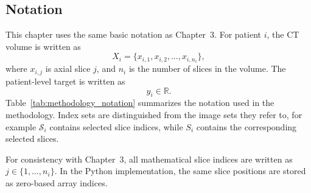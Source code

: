 \subsection{Notation}
\label{sec:notation}

This chapter uses the same basic notation as Chapter~3. For patient \(i\), the CT volume is written as
\[
X_i = \{x_{i,1}, x_{i,2}, \dots, x_{i,n_i}\},
\]
where \(x_{i,j}\) is axial slice \(j\), and \(n_i\) is the number of slices in the volume. The patient-level target is written as
\[
y_i \in \mathbb{R}.
\]
Table~\ref{tab:methodology_notation} summarizes the notation used in the methodology. Index sets are distinguished from the image sets they refer to, for example \(\mathcal{S}_i\) contains selected slice indices, while \(S_i\) contains the corresponding selected slices.

For consistency with Chapter~3, all mathematical slice indices are written as \(j \in \{1,\dots,n_i\}\). In the Python implementation, the same slice positions are stored as zero-based array indices.

